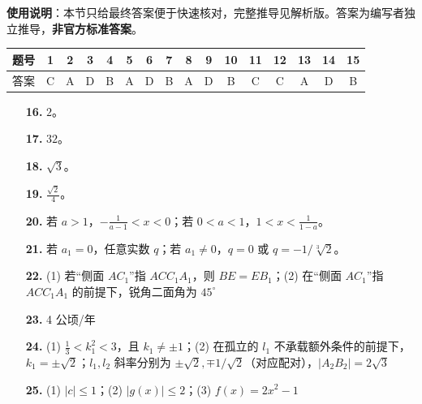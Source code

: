 
\begin{gknotice}
\textbf{使用说明}：本节只给最终答案便于快速核对，完整推导见解析版。答案为编写者独立推导，\textbf{非官方标准答案}。
\end{gknotice}

\begin{center}\begin{tabular}{cccccccccccccccc}
\toprule
题号 & 1 & 2 & 3 & 4 & 5 & 6 & 7 & 8 & 9 & 10 & 11 & 12 & 13 & 14 & 15 \\
\midrule
答案 & C & A & D & B & A & D & B & A & D & B & C & C & A & D & B \\
\bottomrule
\end{tabular}\end{center}

\begin{itemize}[leftmargin=2.6em]
  \item[\textbf{16.}] $2$。
  \item[\textbf{17.}] $32$。
  \item[\textbf{18.}] $\sqrt3$。
  \item[\textbf{19.}] $\frac{\sqrt2}{4}$。
\end{itemize}

\begin{itemize}[leftmargin=2.6em]
  \item[\textbf{20.}] 若 $a>1$，$-\frac1{a-1}<x<0$；若 $0<a<1$，$1<x<\frac1{1-a}$。
  \item[\textbf{21.}] 若 $a_1=0$，任意实数 $q$；若 $a_1\ne0$，$q=0$ 或 $q=-1/\sqrt[3]{2}$。
  \item[\textbf{22.}] (1) 若“侧面 $AC_1$”指 $ACC_1A_1$，则 $BE=EB_1$；(2) 在“侧面 $AC_1$”指 $ACC_1A_1$ 的前提下，锐角二面角为 $45^\circ$
  \item[\textbf{23.}] 4 公顷/年
  \item[\textbf{24.}] (1) $\frac13<k_1^2<3$，且 $k_1\ne\pm1$；(2) 在孤立的 $l_1$ 不承载额外条件的前提下，$k_1=\pm\sqrt2$；$l_1,l_2$ 斜率分别为 $\pm\sqrt2,\mp1/\sqrt2$（对应配对），$|A_2B_2|=2\sqrt3$
  \item[\textbf{25.}] (1) $|c|\le1$；(2) $|g(x)|\le2$；(3) $f(x)=2x^2-1$
\end{itemize}
